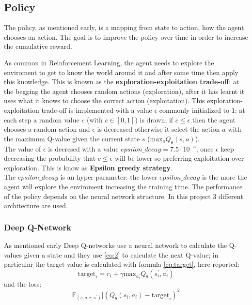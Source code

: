 \documentclass[14pt]{extarticle}
\def\sp{\vspace{5pt}}
\def\pp{\vspace{10pt}\newline}
\begin{document}
\begin{flushleft}
	
	\subsection{Policy}
	\sp
	The policy, as mentioned early, is a mapping from state to action, how the agent chooses an action. The goal is to improve the policy over time in order to increase the cumulative reward. \pp
	
	As common in Reinforcement Learning, the agent needs to explore the enviroment to get to know the world around it and after some time then apply this knowledge.  This is known as the \textbf{exploration-exploitation trade-off}: at the begging the agent chooses random actions (exploration), after it has learnt it uses what it knows to choose the correct action (exploitation). \pp
	This exploration-exploitation trade-off is implemented with a value $\epsilon$ commonly initialized to $1$: at each step a random value $c$ (with $c \in [0,1]$) is drawn, if $c\leq\epsilon$ then the agent chooses a random action and $\epsilon$ is decreased otherwise it select the action $a$ with the maximum Q-value given the current state $s$ ($\text{max}_{a}Q_{\theta}(s,a)$).
	\\
	The value of $\epsilon$ is decresed with a value $epsilon\_decay = 7.5 \cdot 10^{-5}$; once $\epsilon$ keep decreasing the probability that $c\leq\epsilon$ will be lower so preferring exploitation over exploration. This is know as \textbf{Epsilon greedy strategy}.\\
	The $epsilon\_decay$ is an hyper-parameter: the lower $epsilon\_decay$ is the more the agent will explore the enviroment increasing the training time. 
	\pp
	The performance of the policy depends on the neural network structure. In this project 3 different architecture are used. %
	
	\subsubsection{Deep Q-Network}
	\sp
	As mentioned early Deep Q-networks use a neural network to calculate the Q-values given a state and they use \ref{eq:2} to calculate the next Q-value; in particular the target value is calculated with formula \ref{eq:target}, here reported:
	\[
\text{target}_i = r_i + \gamma\text{max}_{a_i^\prime}Q_{\theta}(s_i^{\prime},a_i^{\prime})
\]
and the loss:
\[\mathbb{E}_{(s,a,r,s^\prime)}[(Q_{\theta}(s_i,a_i) - \text{target}_i)^2\] 


\end{flushleft}
\end{document}
